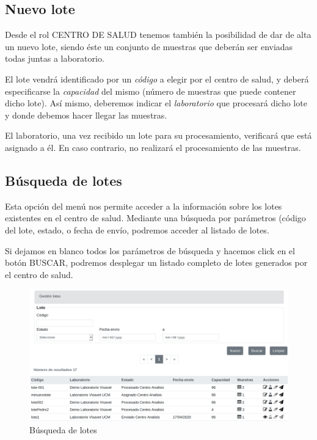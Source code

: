 \documentclass[a4paper,spanish]{paper}
\begin{document}
\subsection{Nuevo lote}

Desde el rol CENTRO DE SALUD tenemos también la posibilidad de dar de alta un nuevo lote, siendo éste un conjunto de muestras que deberán ser enviadas todas juntas a laboratorio.

El lote vendrá identificado por un \emph{código} a elegir por el centro de salud, y deberá especificarse la \emph{capacidad} del mismo (número de muestras que puede contener dicho lote). Así mismo, deberemos indicar el \emph{laboratorio} que procesará dicho lote y donde debemos hacer llegar las muestras. 

\medskip
\begin{tcolorbox}[colback=blue!3!white,colframe=blue(ryb)!50!black,title=\textbf{Tip}]

El laboratorio, una vez recibido un lote para su procesamiento, verificará que está asignado a él. En caso contrario, no realizará el procesamiento de las muestras.

\end{tcolorbox}

\subsection{Búsqueda de lotes}

Esta opción del menú nos permite acceder a la información sobre los lotes existentes en el centro de salud. Mediante una búsqueda por parámetros (código del lote, estado, o fecha de envío, podremos acceder al listado de lotes.

\medskip
\begin{tcolorbox}[colback=blue!3!white,colframe=blue(ryb)!50!black,title=\textbf{Tip}]

Si dejamos en blanco todos los parámetros de búsqueda y hacemos click en el botón BUSCAR, podremos desplegar un listado completo de lotes generados por el centro de salud.

\end{tcolorbox}

\begin{figure}[h]
\centering
\includegraphics[scale=0.6]{Figs/Fig5.png}
\caption{Búsqueda de lotes}
\label{Fig5}
\end{figure}
\end{document}
